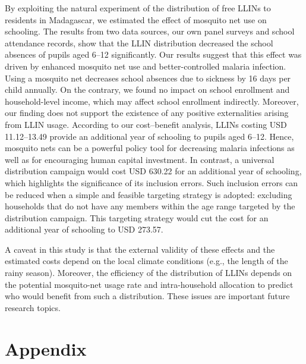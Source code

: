 \documentclass[fleqn,11pt]{article}
\begin{document}
By exploiting the natural experiment of the distribution of free LLINs to residents in Madagascar, we
estimated the effect of mosquito net use on schooling. The results from two
data sources, our own panel surveys and school attendance records, show that the LLIN distribution decreased the school absences of pupils aged 6--12 significantly.
Our results suggest that this effect was driven by enhanced mosquito net use and better-controlled malaria infection. Using a mosquito net decreases school absences due to sickness by 16 days per child annually. On the contrary, we found no impact on school enrollment and household-level income, which may affect school enrollment indirectly. Moreover, our finding does not support the existence of any positive externalities arising from LLIN usage. According to our cost--benefit analysis, LLINs costing USD 11.12--13.49 provide an additional year of schooling to pupils aged 6--12. Hence, mosquito nets can be a powerful policy tool for decreasing malaria infections as well as for encouraging human capital investment. In contrast, a universal distribution campaign would cost USD 630.22 for an additional year of schooling, which highlights the significance of its inclusion errors. Such inclusion errors can be reduced when a simple and feasible targeting strategy is adopted: excluding households that do not have any members within the age range targeted by the distribution campaign. This targeting strategy would cut the cost for an additional year of schooling to USD 273.57.

A caveat in this study is that the external validity of these effects and the estimated costs depend on the local climate conditions (e.g., the length of the rainy season). Moreover, the efficiency of the distribution of LLINs depends on the potential mosquito-net usage rate and intra-household allocation to predict who would benefit from such a distribution. These issues are important future research topics.



% 

\processdelayedfloats
\appendix
{}
\section{Appendix}
\renewcommand{\thefigure}{A\arabic{figure}}
\renewcommand{\thepostfigure}{A\arabic{postfigure}}
\setcounter{figure}{0}
\setcounter{postfigure}{0}
\end{document}
